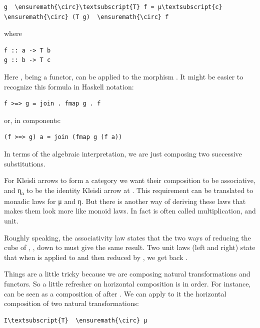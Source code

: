 \begin{Verbatim}[commandchars=\\\{\}]
g  \ensuremath{\circ}\textsubscript{T} f = μ\textsubscript{c}  \ensuremath{\circ} (T g)  \ensuremath{\circ} f
\end{Verbatim}
where

\begin{Verbatim}[commandchars=\\\{\}]
f :: a -> T b
g :: b -> T c
\end{Verbatim}
Here , being a functor, can be applied to the morphism
. It might be easier to recognize this formula in Haskell
notation:

\begin{Verbatim}[commandchars=\\\{\}]
f >=> g = join . fmap g . f
\end{Verbatim}
or, in components:

\begin{Verbatim}[commandchars=\\\{\}]
(f >=> g) a = join (fmap g (f a))
\end{Verbatim}
In terms of the algebraic interpretation, we are just composing two
successive substitutions.

For Kleisli arrows to form a category we want their composition to be
associative, and η\textsubscript{a} to be the identity Kleisli arrow at
. This requirement can be translated to monadic laws for μ and
η. But there is another way of deriving these laws that makes them look
more like monoid laws. In fact  is often called
multiplication, and  unit.

Roughly speaking, the associativity law states that the two ways of
reducing the cube of , , down to  must
give the same result. Two unit laws (left and right) state that when
 is applied to  and then reduced by , we
get back .

Things are a little tricky because we are composing natural
transformations and functors. So a little refresher on horizontal
composition is in order. For instance,  can be seen as a
composition of  after . We can apply to it the
horizontal composition of two natural transformations:

\begin{Verbatim}[commandchars=\\\{\}]
I\textsubscript{T}  \ensuremath{\circ} μ
\end{Verbatim}

